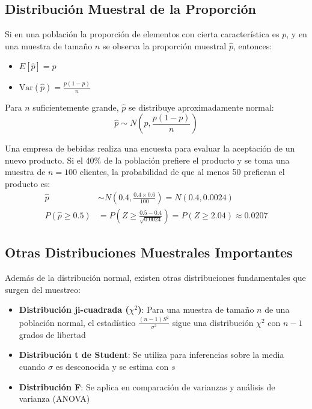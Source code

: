 \subsection{Distribución Muestral de la Proporción}

\begin{definition}
Si en una población la proporción de elementos con cierta característica es $p$, y en una muestra de tamaño $n$ se observa la proporción muestral $\hat{p}$, entonces:
\begin{itemize}
    \item $E[\hat{p}] = p$
    \item $\text{Var}(\hat{p}) = \frac{p(1-p)}{n}$
\end{itemize}
Para $n$ suficientemente grande, $\hat{p}$ se distribuye aproximadamente normal:
\begin{equation}
\hat{p} \sim N\left(p, \frac{p(1-p)}{n}\right)
\end{equation}
\end{definition}

\begin{example}
Una empresa de bebidas realiza una encuesta para evaluar la aceptación de un nuevo producto. Si el 40\% de la población prefiere el producto y se toma una muestra de $n = 100$ clientes, la probabilidad de que al menos 50 prefieran el producto es:
\begin{align}
\hat{p} &\sim N\left(0.4, \frac{0.4 \times 0.6}{100}\right) = N(0.4, 0.0024)\\
P(\hat{p} \geq 0.5) &= P\left(Z \geq \frac{0.5-0.4}{\sqrt{0.0024}}\right) = P(Z \geq 2.04) \approx 0.0207
\end{align}
\end{example}

\subsection{Otras Distribuciones Muestrales Importantes}

\begin{remark}
Además de la distribución normal, existen otras distribuciones fundamentales que surgen del muestreo:
\begin{itemize}
    \item \textbf{Distribución ji-cuadrada ($\chi^2$)}: Para una muestra de tamaño $n$ de una población normal, el estadístico $\frac{(n-1)S^2}{\sigma^2}$ sigue una distribución $\chi^2$ con $n-1$ grados de libertad
    \item \textbf{Distribución t de Student}: Se utiliza para inferencias sobre la media cuando $\sigma$ es desconocida y se estima con $s$
    \item \textbf{Distribución F}: Se aplica en comparación de varianzas y análisis de varianza (ANOVA)
\end{itemize}
\end{remark}


